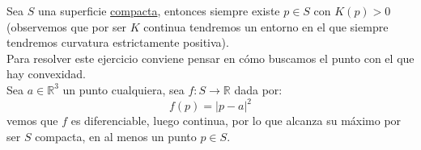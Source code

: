 \begin{ejercicio}
    Sea $S$ una superficie \underline{compacta}, entonces siempre existe $p\in S$ con $K(p)>0$ (observemos que por ser $K$ continua tendremos un entorno en el que siempre tendremos curvatura estrictamente positiva).\\

    \noindent
    Para resolver este ejercicio conviene pensar en cómo buscamos el punto con el que hay convexidad.\\

    \noindent
    Sea $a\in \mathbb{R}^3$ un punto cualquiera, sea $f:S\to\mathbb{R}$ dada por:
    \begin{equation*}
        f(p) = |p-a|^2
    \end{equation*}
    vemos que $f$ es diferenciable, luego continua, por lo que alcanza su máximo por ser $S$ compacta, en al menos un punto $p\in S$.\\


\end{ejercicio}
